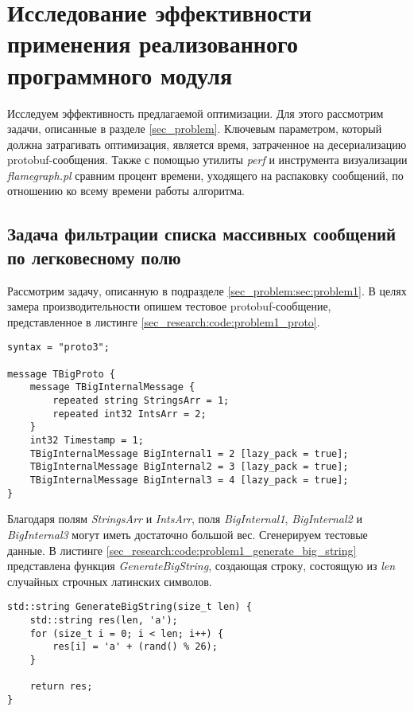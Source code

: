 \section{Исследование эффективности применения реализованного программного модуля}

Исследуем эффективность предлагаемой оптимизации. Для этого рассмотрим задачи, описанные в разделе \ref{sec_problem}.
Ключевым параметром, который должна затрагивать оптимизация, является время, затраченное на десериализацию protobuf-сообщения.
Также с помощью утилиты \textit{perf} и инструмента визуализации \textit{flamegraph.pl} сравним процент времени, уходящего на распаковку сообщений, по отношению ко всему времени работы алгоритма.

\subsection{Задача фильтрации списка массивных сообщений по легковесному полю}

Рассмотрим задачу, описанную в подразделе \ref{sec_problem:sec:problem1}.
В целях замера производительности опишем тестовое protobuf-сообщение, представленное в листинге \ref{sec_research:code:problem1_proto}.

\noindent\begin{minipage}{\linewidth}
\begin{lstlisting}[style=CodeListing, caption={Тестовое protobuf-сообщение}, label=sec_research:code:problem1_proto]
syntax = "proto3";

message TBigProto {
    message TBigInternalMessage {
        repeated string StringsArr = 1;
        repeated int32 IntsArr = 2;
    }
    int32 Timestamp = 1;
    TBigInternalMessage BigInternal1 = 2 [lazy_pack = true];
    TBigInternalMessage BigInternal2 = 3 [lazy_pack = true];
    TBigInternalMessage BigInternal3 = 4 [lazy_pack = true];
}
\end{lstlisting}
\end{minipage}

Благодаря полям \textit{StringsArr} и \textit{IntsArr}, поля \textit{BigInternal1}, \textit{BigInternal2} и \textit{BigInternal3} могут иметь достаточно большой вес.
Сгенерируем тестовые данные. 
В листинге \ref{sec_research:code:problem1_generate_big_string} представлена функция \textit{GenerateBigString}, создающая строку, состоящую из \textit{len} случайных строчных латинских символов.

\noindent\begin{minipage}{\linewidth}
\begin{lstlisting}[style=CodeListing, caption={Функция GenerateBigString}, label=sec_research:code:problem1_generate_big_string]
std::string GenerateBigString(size_t len) {
    std::string res(len, 'a');
    for (size_t i = 0; i < len; i++) {
        res[i] = 'a' + (rand() % 26);
    }

    return res;
}
\end{lstlisting}
\end{minipage}

